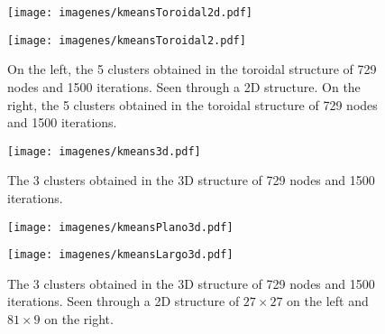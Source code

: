 \documentclass[conference]{IEEEtran}
\begin{document}
\begin{figure}[!htb]
\begin{minipage}{0.1\textwidth}
\centering
\texttt{[image: imagenes/kmeansToroidal2d.pdf]}
\end{minipage}\hfill
\begin{minipage}{0.25\textwidth}
\centering
\texttt{[image: imagenes/kmeansToroidal2.pdf]}
\end{minipage}
\caption{
On the left, the 5 clusters obtained in the toroidal structure of 729 nodes and 1500 iterations. Seen through a 2D structure. On the right, the 5 clusters obtained in the toroidal structure of 729 nodes and 1500 iterations.}
\label{fig16}
\end{figure}

\begin{figure}[!htbp]
\centerline{\texttt{[image: imagenes/kmeans3d.pdf]}}
\caption{The 3 clusters obtained in the 3D structure of 729 nodes and 1500 iterations.}
\label{fig19}
\end{figure}

\begin{figure}[!htb]
\begin{minipage}{0.1\textwidth}
\centering
\texttt{[image: imagenes/kmeansPlano3d.pdf]}
\end{minipage}\hfill
\begin{minipage}{0.1\textwidth}
\centering
\texttt{[image: imagenes/kmeansLargo3d.pdf]}
\end{minipage}
\caption{The 3 clusters obtained in the 3D structure of 729 nodes and 1500 iterations. Seen through a 2D structure of $27\times27$ on the left and $81\times9$ on the right.}
\label{fig18}
\end{figure}
\end{document}
